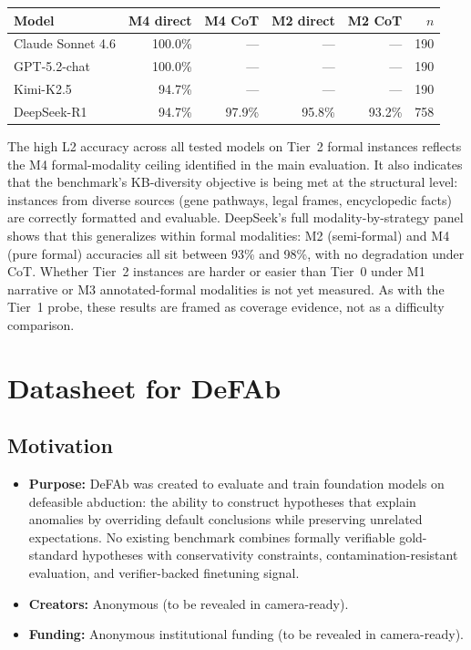 \documentclass{article}
\theoremstyle{definition}
\begin{document}
\begin{table}[h]
\centering
\small
\begin{tabular}{lrrrr|r}
\toprule
Model & M4 direct & M4 CoT & M2 direct & M2 CoT & $n$ \\
\midrule
Claude Sonnet 4.6  & 100.0\% & --- & --- & --- & 190 \\
GPT-5.2-chat       & 100.0\% & --- & --- & --- & 190 \\
Kimi-K2.5          & \phantom{0}94.7\% & --- & --- & --- & 190 \\
DeepSeek-R1        & \phantom{0}94.7\% & 97.9\% & 95.8\% & 93.2\% & 758 \\
\bottomrule
\end{tabular}
\end{table}

The high L2 accuracy across all tested models on Tier~2 formal instances reflects the M4 formal-modality ceiling identified in the main evaluation. It also indicates that the benchmark's KB-diversity objective is being met at the structural level: instances from diverse sources (gene pathways, legal frames, encyclopedic facts) are correctly formatted and evaluable. DeepSeek's full modality-by-strategy panel shows that this generalizes within formal modalities: M2 (semi-formal) and M4 (pure formal) accuracies all sit between 93\% and 98\%, with no degradation under CoT. Whether Tier~2 instances are harder or easier than Tier~0 under M1 narrative or M3 annotated-formal modalities is not yet measured. As with the Tier~1 probe, these results are framed as coverage evidence, not as a difficulty comparison.

\section{Datasheet for DeFAb}\label{app:datasheet}

\subsection*{Motivation}

\begin{itemize}[nosep]
\item \textbf{Purpose:} DeFAb was created to evaluate and train foundation models on defeasible abduction: the ability to construct hypotheses that explain anomalies by overriding default conclusions while preserving unrelated expectations. No existing benchmark combines formally verifiable gold-standard hypotheses with conservativity constraints, contamination-resistant evaluation, and verifier-backed finetuning signal.
\item \textbf{Creators:} Anonymous (to be revealed in camera-ready).
\item \textbf{Funding:} Anonymous institutional funding (to be revealed in camera-ready).
\end{itemize}
\end{document}
